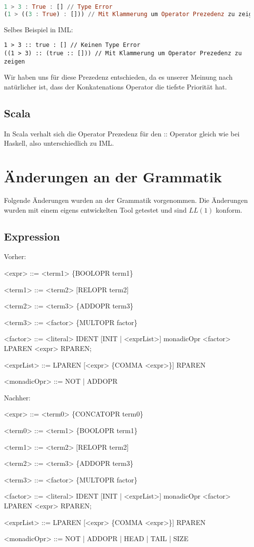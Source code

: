 \documentclass[a4paper,notitlepage,oneside]{scrartcl}
\begin{document}
\begin{lstlisting}[language=haskell, caption=Ungültige Listen Konkatenation in Haskell]
1 > 3 : True : [] // Type Error
(1 > ((3 : True) : [])) // Mit Klammerung um Operator Prezedenz zu zeigen
\end{lstlisting}

Selbes Beispiel in IML:

\begin{lstlisting}[language=iml, caption=Gültige Listen Konkatenation in Scala]
1 > 3 :: true : [] // Keinen Type Error
((1 > 3) :: (true :: [])) // Mit Klammerung um Operator Prezedenz zu zeigen
\end{lstlisting}
Wir haben uns für diese Prezedenz entschieden, da es unserer Meinung nach natürlicher ist, dass der Konkatenations Operator die tiefste Priorität hat.

\subsection{Scala}
In Scala verhalt sich die Operator Prezedenz für den :: Operator gleich wie bei Haskell, also unterschiedlich zu IML.


\newpage
\section{Änderungen an der Grammatik}
Folgende Änderungen wurden an der Grammatik vorgenommen. Die Änderungen wurden mit einem eigens entwickelten Tool getestet und sind $LL(1)$ konform.
\subsection{Expression}
Vorher: 
\begin{grammar}
<expr> ::= <term1> \{BOOLOPR term1\}

<term1> ::= <term2> [RELOPR term2]

<term2> ::= <term3> \{ADDOPR term3\}

<term3> ::= <factor> \{MULTOPR factor\}

<factor> ::= <literal>
		\alt IDENT [INIT | <exprList>]
		\alt monadicOpr <factor>
		\alt LPAREN <expr> RPAREN;
		
<exprList> ::= LPAREN [<expr> \{COMMA <expr>\}] RPAREN

<monadicOpr> ::= NOT | ADDOPR
\end{grammar}
Nachher:
\begin{grammar}
<expr> ::= <term0> \{CONCATOPR term0\}

<term0> ::= <term1> \{BOOLOPR term1\}

<term1> ::= <term2> [RELOPR term2]

<term2> ::= <term3> \{ADDOPR term3\}

<term3> ::= <factor> \{MULTOPR factor\}

<factor> ::= <literal>
		\alt IDENT [INIT | <exprList>]
		\alt monadicOpr <factor>
		\alt LPAREN <expr> RPAREN;
		
<exprList> ::= LPAREN [<expr> \{COMMA <expr>\}] RPAREN

<monadicOpr> ::= NOT | ADDOPR | HEAD | TAIL | SIZE

\end{grammar}
\end{document}
